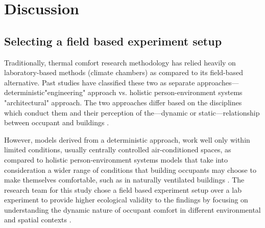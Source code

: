 \documentclass[]{interact}
\theoremstyle{plain}%
\theoremstyle{definition}
\theoremstyle{remark}
\begin{document}
\section{Discussion}

\subsection{Selecting a field based experiment setup}
Traditionally, thermal comfort research methodology has relied heavily on laboratory-based methods (climate chambers) as compared to its field-based alternative. Past studies have classified these two as separate approaches---deterministic"engineering" approach vs. holistic person-environment systems "architectural" approach. The two approaches differ based on the disciplines which conduct them and their perception of the---dynamic or static---relationship between occupant and buildings \citep{dedear}.


However, models derived from a deterministic approach, work well only within limited conditions, usually centrally controlled air-conditioned spaces, as compared to holistic person-environment systems models that take into consideration a wider range of conditions that building occupants may choose to make themselves comfortable, such as in naturally ventilated buildings \citep{dedear2, de1998developing}. The research team for this study chose a field based experiment setup over a lab experiment to provide higher ecological validity to the findings by focusing on understanding the dynamic nature of occupant comfort in different environmental and spatial contexts \citep{andrade2018internal}. 


\end{document}
